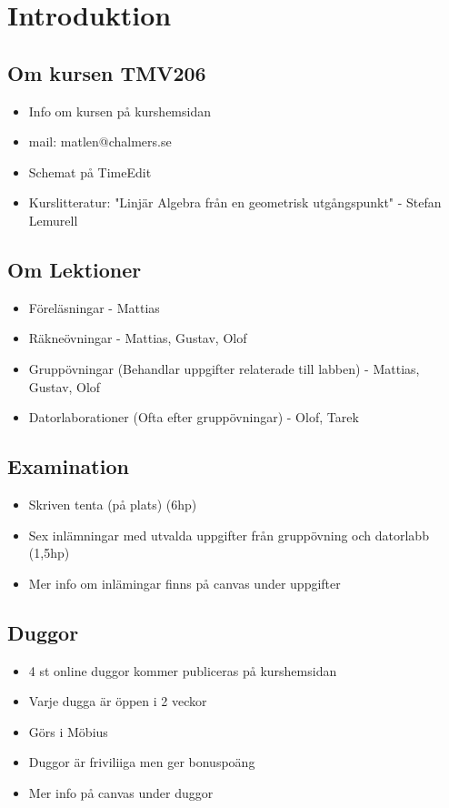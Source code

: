 \chapter{Introduktion}
    \section{Om kursen TMV206}
        \begin{itemize}
            \item Info om kursen på kurshemsidan
            \item mail: matlen@chalmers.se
            \item Schemat på TimeEdit
            \item Kurslitteratur: "Linjär Algebra från en geometrisk utgångspunkt" - Stefan Lemurell
        \end{itemize}
        
        \section{Om Lektioner}
        \begin{itemize}
            \item Föreläsningar - Mattias
            \item Räkneövningar - Mattias, Gustav, Olof
            \item Gruppövningar (Behandlar uppgifter relaterade till labben) - Mattias, Gustav, Olof
            \item Datorlaborationer (Ofta efter gruppövningar) - Olof, Tarek
        \end{itemize}

        \section{Examination}
        \begin{itemize}
            \item Skriven tenta (på plats) (6hp)
            \item Sex inlämningar med utvalda uppgifter från gruppövning och datorlabb (1,5hp)
            \item Mer info om inlämingar finns på canvas under uppgifter
        \end{itemize}

        \section{Duggor}
        \begin{itemize}
            \item 4 st online duggor kommer publiceras på kurshemsidan
            \item Varje dugga är öppen i 2 veckor
            \item Görs i Möbius
            \item Duggor är friviliiga men ger bonuspoäng
            \item Mer info på canvas under duggor
        \end{itemize}

